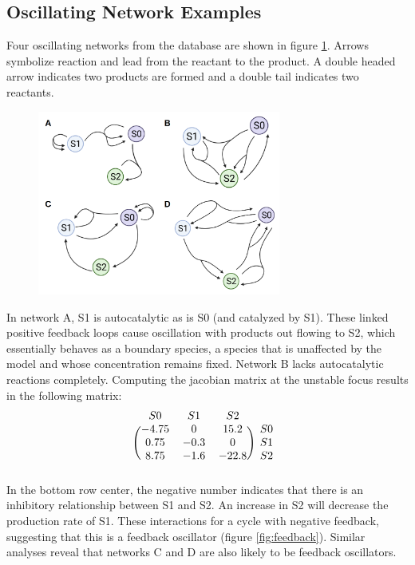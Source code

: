 \documentclass[12pt]{report}
\begin{document}
\subsection{Oscillating Network Examples}
Four oscillating networks from the database are shown in figure \ref{fig:model-diagrams}. Arrows symbolize reaction and lead from the reactant to the product. A double headed arrow indicates two products are formed and a double tail indicates two reactants. 


\begin{figure}
    \centering
    \includegraphics[width=8cm]{images/model-diagrams.png}
    \label{fig:model-diagrams}
\end{figure}

In network A, S1 is autocatalytic as is S0 (and catalyzed by S1). These linked positive feedback loops cause oscillation with products out flowing to S2, which essentially behaves as a boundary species, a species that is unaffected by the model and whose concentration remains fixed.  Network B lacks autocatalytic reactions completely. Computing the jacobian matrix at the unstable focus results in the following matrix:
\[
\begin{blockarray}{cccc}
S0 & S1 & S2 \\
\begin{block}{(ccc)c}
  -4.75 & 0 & 15.2 & S0 \\
  0.75 & -0.3 & 0 & S1 \\
  8.75 & -1.6 & -22.8 & S2 \\
\end{block}
\end{blockarray}
 \]
In the bottom row center, the negative number indicates that there is an inhibitory relationship between S1 and S2. An increase in S2 will decrease the production rate of S1. These interactions for a cycle with negative feedback, suggesting that this is a feedback oscillator (figure \ref{fig:feedback}). Similar analyses reveal that networks C and D are also likely to be feedback oscillators.
\end{document}
